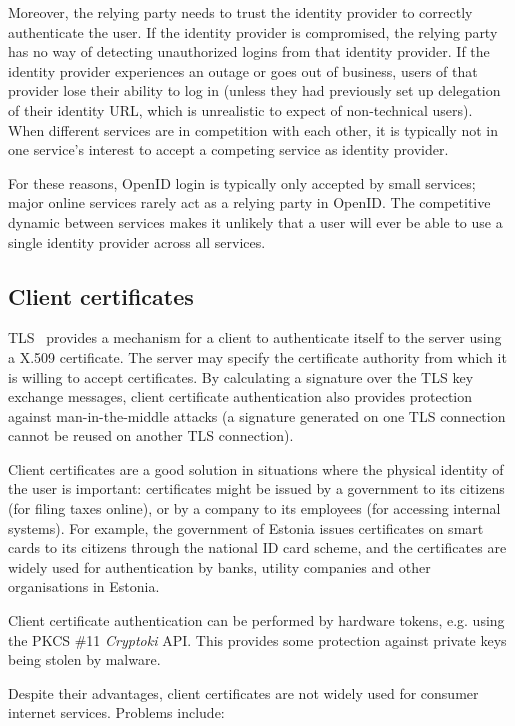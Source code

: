 Moreover, the relying party needs to trust the identity provider to correctly authenticate the user.
If the identity provider is compromised, the relying party has no way of detecting unauthorized
logins from that identity provider. If the identity provider experiences an outage or goes out of
business, users of that provider lose their ability to log in (unless they had previously set up
delegation of their identity URL, which is unrealistic to expect of non-technical users). When
different services are in competition with each other, it is typically not in one service's interest
to accept a competing service as identity provider.

For these reasons, OpenID login is typically only accepted by small services; major online services
rarely act as a relying party in OpenID. The competitive dynamic between services makes it unlikely
that a user will ever be able to use a single identity provider across all services.

\subsection{Client certificates}

TLS~\cite{TLS} provides a mechanism for a client to authenticate itself to the server using a X.509
certificate. The server may specify the certificate authority from which it is willing to accept
certificates. By calculating a signature over the TLS key exchange messages, client certificate
authentication also provides protection against man-in-the-middle attacks (a signature generated on
one TLS connection cannot be reused on another TLS connection).

Client certificates are a good solution in situations where the physical identity of the user is
important: certificates might be issued by a government to its citizens (for filing taxes online),
or by a company to its employees (for accessing internal systems). For example, the government of
Estonia issues certificates on smart cards to its citizens through the national ID card scheme, and
the certificates are widely used for authentication by banks, utility companies and other
organisations in Estonia.~\cite{Parsovs14}

Client certificate authentication can be performed by hardware tokens, e.g. using the PKCS \#11
\emph{Cryptoki} API. This provides some protection against private keys being stolen by malware.

Despite their advantages, client certificates are not widely used for consumer internet services.
Problems include:


